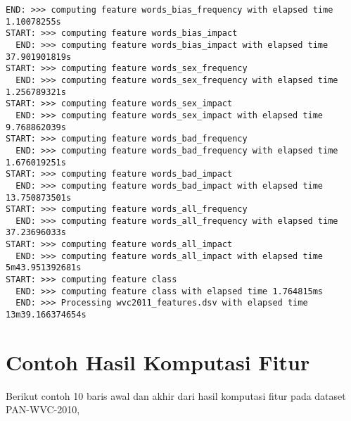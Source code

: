 \begin{lstlisting}[style=data,basicstyle=\tiny\ttfamily]
  END: >>> computing feature words_bias_frequency with elapsed time 1.10078255s
START: >>> computing feature words_bias_impact
  END: >>> computing feature words_bias_impact with elapsed time 37.901901819s
START: >>> computing feature words_sex_frequency
  END: >>> computing feature words_sex_frequency with elapsed time 1.256789321s
START: >>> computing feature words_sex_impact
  END: >>> computing feature words_sex_impact with elapsed time 9.768862039s
START: >>> computing feature words_bad_frequency
  END: >>> computing feature words_bad_frequency with elapsed time 1.676019251s
START: >>> computing feature words_bad_impact
  END: >>> computing feature words_bad_impact with elapsed time 13.750873501s
START: >>> computing feature words_all_frequency
  END: >>> computing feature words_all_frequency with elapsed time 37.23696033s
START: >>> computing feature words_all_impact
  END: >>> computing feature words_all_impact with elapsed time 5m43.951392681s
START: >>> computing feature class
  END: >>> computing feature class with elapsed time 1.764815ms
  END: >>> Processing wvc2011_features.dsv with elapsed time 13m39.166374654s
\end{lstlisting}

\newpage
\section{Contoh Hasil Komputasi Fitur}
\label{appendix:features_output_example}

Berikut contoh 10 baris awal dan akhir dari hasil komputasi fitur pada dataset
PAN-WVC-2010,

